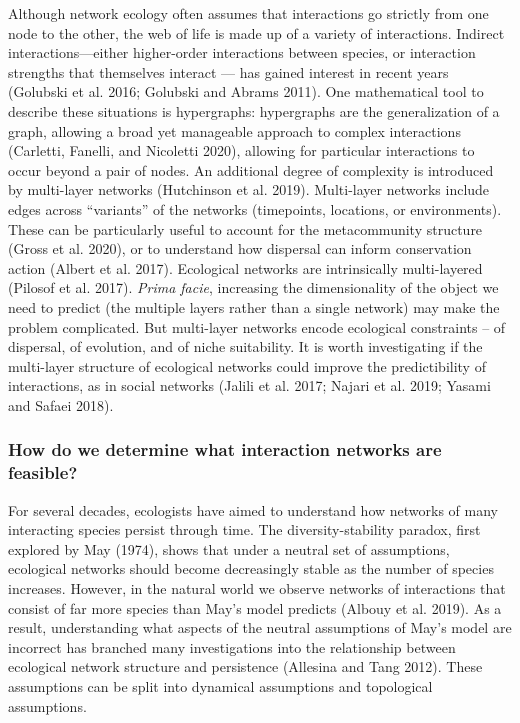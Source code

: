 \documentclass[11pt]{article}
\begin{document}
Although network ecology often assumes that interactions go strictly
from one node to the other, the web of life is made up of a variety of
interactions. Indirect interactions---either higher-order interactions
between species, or interaction strengths that themselves interact ---
has gained interest in recent years (Golubski et al. 2016; Golubski and
Abrams 2011). One mathematical tool to describe these situations is
hypergraphs: hypergraphs are the generalization of a graph, allowing a
broad yet manageable approach to complex interactions (Carletti,
Fanelli, and Nicoletti 2020), allowing for particular interactions to
occur beyond a pair of nodes. An additional degree of complexity is
introduced by multi-layer networks (Hutchinson et al. 2019). Multi-layer
networks include edges across ``variants'' of the networks (timepoints,
locations, or environments). These can be particularly useful to account
for the metacommunity structure (Gross et al. 2020), or to understand
how dispersal can inform conservation action (Albert et al. 2017).
Ecological networks are intrinsically multi-layered (Pilosof et al.
2017). \emph{Prima facie}, increasing the dimensionality of the object
we need to predict (the multiple layers rather than a single network)
may make the problem complicated. But multi-layer networks encode
ecological constraints -- of dispersal, of evolution, and of niche
suitability. It is worth investigating if the multi-layer structure of
ecological networks could improve the predictibility of interactions, as
in social networks (Jalili et al. 2017; Najari et al. 2019; Yasami and
Safaei 2018).

\hypertarget{how-do-we-determine-what-interaction-networks-are-feasible}{%
\subsubsection{How do we determine what interaction networks are
feasible?}\label{how-do-we-determine-what-interaction-networks-are-feasible}}

For several decades, ecologists have aimed to understand how networks of
many interacting species persist through time. The diversity-stability
paradox, first explored by May (1974), shows that under a neutral set of
assumptions, ecological networks should become decreasingly stable as
the number of species increases. However, in the natural world we
observe networks of interactions that consist of far more species than
May's model predicts (Albouy et al. 2019). As a result, understanding
what aspects of the neutral assumptions of May's model are incorrect has
branched many investigations into the relationship between ecological
network structure and persistence (Allesina and Tang 2012). These
assumptions can be split into dynamical assumptions and topological
assumptions.
\end{document}
